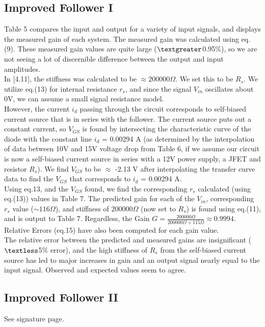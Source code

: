 \documentclass{article}
\begin{document}
\subsection{Improved Follower I}
    Table 5 compares the input and output for a variety of input signals, and displays the measured gain of each system. The measured gain was calculated using eq.(9). These measured gain values are quite large ($\textgreater$0.95$\%$), so we are not seeing a lot of discernible difference between the output and input amplitudes.\\\indent 
    In [4.11], the stiffness was calculated to be $\approx  200000\Omega$. We set this to be $R_s$. We utilize eq.(13) for internal resistance $r_s$, and since the signal $V_{in}$ oscillates about 0V, we can assume a small signal resistance model. \\\indent However, the current $i_d$ passing through the circuit corresponds to self-biased current source that is in series with the follower. The current source puts out a constant current, so $V_{GS}$ is found by intersecting the characteristic curve of the diode with the constant line $i_d$ = 0.00294 A (as determined by the interpolation of data between 10V and 15V voltage drop from Table 6, if we assume our circuit is now a self-biased current source in series with a 12V power supply, a JFET and resistor $R_s$). We find $V_{GS}$ to be $\approx$ -2.13 V after interpolating the transfer curve data to find the $V_{GS}$ that corresponds to $i_d$ = 0.00294 A.\\\indent  Using eq.13, and the $V_{GS}$ found,
     we find the corresponding $r_s$ calculated (using eq.(13)) values in Table 7. The predicted gain for each of the $V_{in}$, corresponding $r_s$ value ($\sim 116\Omega$), and stiffness of $200000\Omega$ (now set to $R_s$) is found using eq.(11), and is output to Table 7. Regardless, the Gain $G = \frac{200000\Omega}{200000\Omega + 115\Omega} \approx 0.9994$.  Relative Errors (eq.15) have also been computed for each gain value.\\\indent 
     The relative error between the predicted and measured gains are insignificant ($\textless$5$\%$ error), and the high stiffness of $R_s$ from the self-biased current source has led to major increases in gain and an output signal nearly equal to the input signal. Observed and expected values seem to agree.
    

\subsection{Improved Follower II}
    See signature page.
    
\end{document}

